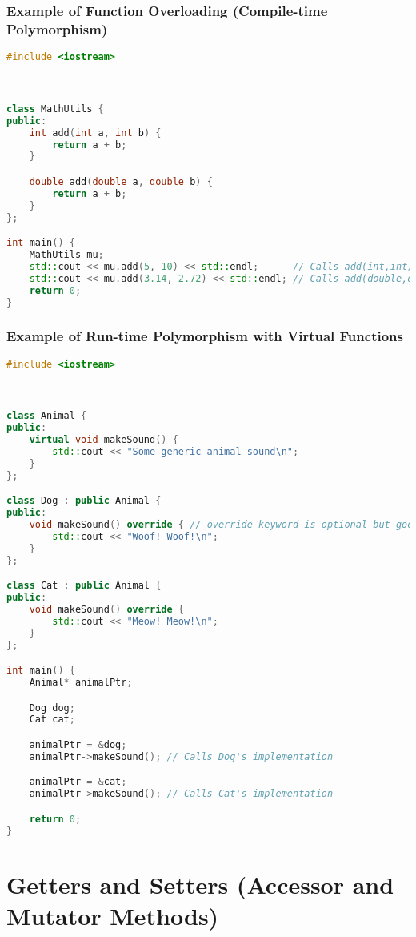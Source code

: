 \documentclass[a4paper,12pt]{article}
\begin{document}
\subsubsection{Example of Function Overloading (Compile-time Polymorphism)}
\begin{lstlisting}[language=C++]
#include <iostream>



class MathUtils {
public:
    int add(int a, int b) {
        return a + b;
    }

    double add(double a, double b) {
        return a + b;
    }
};

int main() {
    MathUtils mu;
    std::cout << mu.add(5, 10) << std::endl;      // Calls add(int,int)
    std::cout << mu.add(3.14, 2.72) << std::endl; // Calls add(double,double)
    return 0;
}
\end{lstlisting}

\subsubsection{Example of Run-time Polymorphism with Virtual Functions}
\begin{lstlisting}[language=C++]
#include <iostream>



class Animal {
public:
    virtual void makeSound() {
        std::cout << "Some generic animal sound\n";
    }
};

class Dog : public Animal {
public:
    void makeSound() override { // override keyword is optional but good practice
        std::cout << "Woof! Woof!\n";
    }
};

class Cat : public Animal {
public:
    void makeSound() override {
        std::cout << "Meow! Meow!\n";
    }
};

int main() {
    Animal* animalPtr;

    Dog dog;
    Cat cat;

    animalPtr = &dog;
    animalPtr->makeSound(); // Calls Dog's implementation

    animalPtr = &cat;
    animalPtr->makeSound(); // Calls Cat's implementation

    return 0;
}
\end{lstlisting}

\section{Getters and Setters (Accessor and Mutator Methods)}
\end{document}
